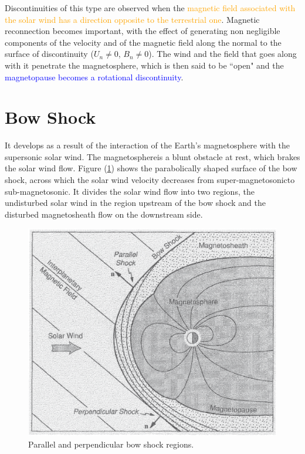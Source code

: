 \documentclass[12pt,a4paper]{article}
\begin{document}
Discontinuities of this type are observed when the \textcolor{orange}{magnetic field associated with the solar wind has a direction opposite to the terrestrial one}. Magnetic reconnection becomes important, with the effect of generating non negligible components of the velocity and of the magnetic field along the normal to the surface of discontinuity ($U_n \neq 0$, $B_n \neq 0$). The wind and the field that goes along with it penetrate the magnetosphere, which is then said to be ``open" and the \textcolor{blue}{magnetopause becomes a rotational discontinuity}.

\section{Bow Shock}
\cite{1996bspp.book.....B} It develops as a result of the interaction of the Earth's magnetosphere with the supersonic solar wind. The magnetosphereis a blunt obstacle at rest, which brakes the solar wind flow. Figure (\ref{fig:bow}) shows the parabolically shaped surface of the bow shock, across which the solar wind velocity decreases from super-magnetosonicto sub-magnetosonic. It divides the solar wind flow into two regions, the undisturbed solar wind in the region upstream of the bow shock and the disturbed magnetosheath flow on the downstream side. 

\begin{figure}
\centering
\includegraphics[height=10.cm,angle=0]{bow_shock.eps}
\caption{
Parallel and perpendicular bow shock regions.
} 
\label{fig:bow}
\end{figure}
\end{document}
